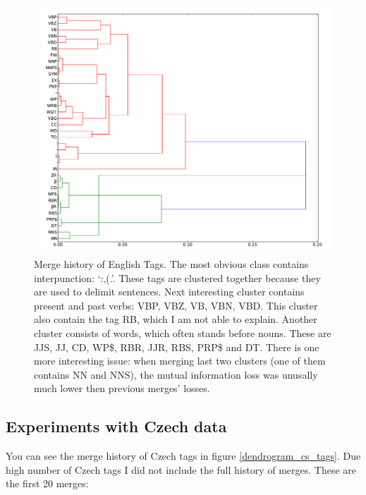 \documentclass[12pt,a4paper]{article}
\begin{document}
\begin{figure}[h!]
  \centering
  \includegraphics[width=\textwidth]{dendrogram_en_tags}

  \caption{Merge history of English Tags. The most obvious class contains
    interpunction: `:,(.'. These tags are clustered together because they are
    used to delimit sentences. Next interesting cluster contains present and
    past verbs: VBP, VBZ, VB, VBN, VBD. This cluster also contain the tag RB,
    which I am not able to explain. Another cluster consists of words, which
    often stands before nouns. These are JJS, JJ, CD, WP\$, RBR, JJR, RBS,
    PRP\$ and DT. There is one more interesting issue: when merging last two
    clusters (one of them contains NN and NNS), the mutual information loss was
    unusally much lower then previous merges' losses.  }

  \label{dendrogram_en_tags}
\end{figure}

\subsection{Experiments with Czech data}

You can see the merge history of Czech tags in figure \ref{dendrogram_cs_tags}. Due
high number of Czech tags I did not include the full history of merges. These are the
first 20 merges:
\end{document}
